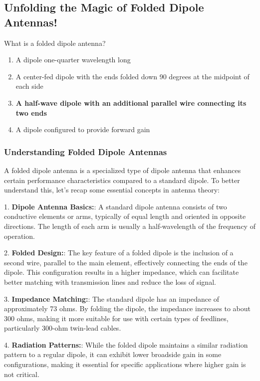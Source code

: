 \subsection{Unfolding the Magic of Folded Dipole Antennas!}

\begin{tcolorbox}[colback=gray!10, colframe=black, title=E9C08] What is a folded dipole antenna?
\begin{enumerate}
    \item A dipole one-quarter wavelength long
    \item A center-fed dipole with the ends folded down 90 degrees at the midpoint of each side
    \item \textbf{A half-wave dipole with an additional parallel wire connecting its two ends}
    \item A dipole configured to provide forward gain
\end{enumerate} \end{tcolorbox}

\subsubsection{Understanding Folded Dipole Antennas}

A folded dipole antenna is a specialized type of dipole antenna that enhances certain performance characteristics compared to a standard dipole. To better understand this, let's recap some essential concepts in antenna theory:

1. \textbf{Dipole Antenna Basics:}: A standard dipole antenna consists of two conductive elements or arms, typically of equal length and oriented in opposite directions. The length of each arm is usually a half-wavelength of the frequency of operation.

2. \textbf{Folded Design:}: The key feature of a folded dipole is the inclusion of a second wire, parallel to the main element, effectively connecting the ends of the dipole. This configuration results in a higher impedance, which can facilitate better matching with transmission lines and reduce the loss of signal.

3. \textbf{Impedance Matching:}: The standard dipole has an impedance of approximately 73 ohms. By folding the dipole, the impedance increases to about 300 ohms, making it more suitable for use with certain types of feedlines, particularly 300-ohm twin-lead cables.

4. \textbf{Radiation Patterns:}: While the folded dipole maintains a similar radiation pattern to a regular dipole, it can exhibit lower broadside gain in some configurations, making it essential for specific applications where higher gain is not critical.

